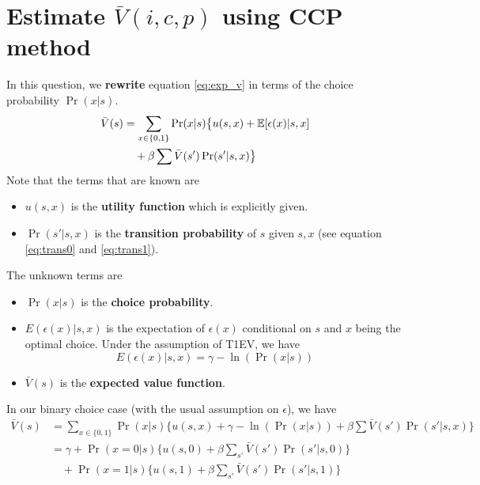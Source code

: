 \documentclass[12pt]{article}[margin=1in]
\begin{document}
\section{Estimate $\bar{V}(i,c,p)$ using CCP method}
In this question, we \textbf{rewrite} equation \ref{eq:exp_v} in terms of the choice probability $\Pr(x|s)$.
\begin{equation}
    \begin{split}
        \bar{V}(s) & =\sum_{x \in \{0,1\}} \Pr(x|s) \big\{ u(s,x) + \mathbb{E}[\epsilon(x)|s,x] \\
                   & \quad + \beta \sum \bar{V}(s') \Pr(s'|s,x) \big\}
    \end{split}
\end{equation}
Note that the terms that are known are
\begin{itemize}
    \item $u(s,x)$ is the \textbf{utility function} which is explicitly given.
    \item $\Pr(s'|s,x)$ is the \textbf{transition probability} of $s$ given $s,x$ (see equation \ref{eq:trans0} and \ref{eq:trans1}).
\end{itemize}
The unknown terms are
\begin{itemize}
    \item $\Pr(x|s)$ is the \textbf{choice probability}.
    \item $E(\epsilon(x)|s,x)$ is the expectation of $\epsilon(x)$ conditional on $s$ and $x$ being the optimal choice. Under the assumption of T1EV, we have
          \begin{equation*}
              E(\epsilon(x)|s,x)=\gamma-\ln(\Pr(x|s))
          \end{equation*}
    \item $\bar{V}(s)$ is the \textbf{expected value function}.
\end{itemize}
In our binary choice case (with the usual assumption on $\epsilon$), we have
\begin{equation}\label{eq:exp_v_bin_ccp}
    \begin{split}
        \bar{V}(s) & =\sum_{x \in \{0,1\}} \Pr(x|s) \big\{ u(s,x) + \gamma-\ln(\Pr(x|s)) +\beta \sum \bar{V}(s') \Pr(s'|s,x) \big\} \\
                   & =\gamma + \Pr(x=0|s) \{u(s,0) + \beta \sum_{s'} \bar{V}(s') \Pr(s'|s,0)\}                                      \\
                   & \quad + \Pr(x=1|s) \{u(s,1) + \beta \sum_{s'} \bar{V}(s') \Pr(s'|s,1)\}                                        \\
    \end{split}
\end{equation}
\end{document}
